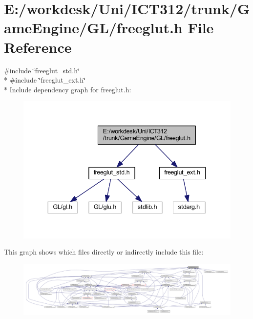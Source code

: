 \section{E\+:/workdesk/\+Uni/\+I\+C\+T312/trunk/\+Game\+Engine/\+G\+L/freeglut.h File Reference}
\label{freeglut_8h}
{\ttfamily \#include \char`\"{}freeglut\+\_\+std.\+h\char`\"{}}\\*
{\ttfamily \#include \char`\"{}freeglut\+\_\+ext.\+h\char`\"{}}\\*
Include dependency graph for freeglut.\+h\+:\nopagebreak
\begin{figure}[H]
\begin{center}
\leavevmode
\includegraphics[width=337pt]{d9/d12/freeglut_8h__incl}
\end{center}
\end{figure}
This graph shows which files directly or indirectly include this file\+:
\nopagebreak
\begin{figure}[H]
\begin{center}
\leavevmode
\includegraphics[width=350pt]{d5/d44/freeglut_8h__dep__incl}
\end{center}
\end{figure}
